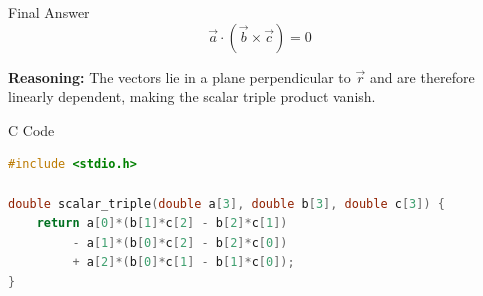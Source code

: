 \documentclass{beamer}
\begin{document}
\begin{frame}{Final Answer}
\[
\boxed{\vec{a} \cdot (\vec{b} \times \vec{c}) = 0}
\]

\textbf{Reasoning:} The vectors lie in a plane perpendicular to $\vec{r}$ and are therefore linearly dependent, making the scalar triple product vanish.
\end{frame}
\begin{frame}[fragile]{C Code}
\begin{lstlisting}[language=C]
#include <stdio.h>

double scalar_triple(double a[3], double b[3], double c[3]) {
    return a[0]*(b[1]*c[2] - b[2]*c[1])
         - a[1]*(b[0]*c[2] - b[2]*c[0])
         + a[2]*(b[0]*c[1] - b[1]*c[0]);
}
    \end{lstlisting}
\end{frame}
\end{document}

